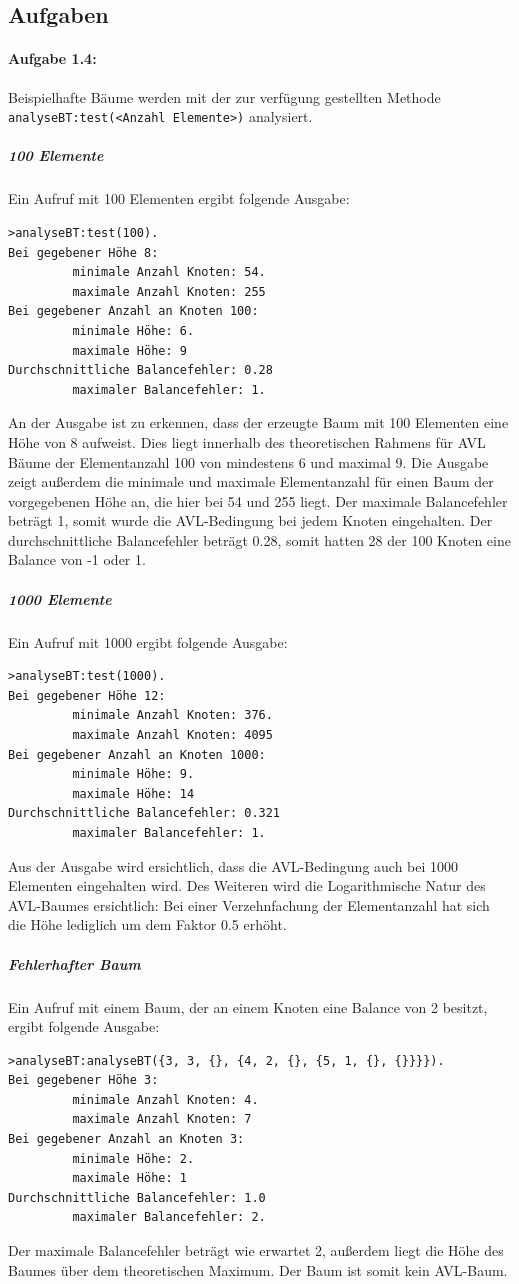 \FloatBarrier
\subsection{Aufgaben}\label{subsec:aufgaben}

\paragraph{Aufgabe 1.4:}
Beispielhafte Bäume werden mit der zur verfügung gestellten Methode\\
\verb|analyseBT:test(<Anzahl Elemente>)| analysiert.
\subparagraph{100 Elemente}
Ein Aufruf mit 100 Elementen ergibt folgende Ausgabe:
\begin{verbatim}
>analyseBT:test(100).
Bei gegebener Höhe 8:
         minimale Anzahl Knoten: 54.
         maximale Anzahl Knoten: 255
Bei gegebener Anzahl an Knoten 100:
         minimale Höhe: 6.
         maximale Höhe: 9
Durchschnittliche Balancefehler: 0.28
         maximaler Balancefehler: 1.
\end{verbatim}

An der Ausgabe ist zu erkennen, dass der erzeugte Baum mit 100 Elementen eine Höhe von 8
aufweist.
Dies liegt innerhalb des theoretischen Rahmens für AVL Bäume der Elementanzahl 100 von mindestens
6 und maximal 9.
Die Ausgabe zeigt außerdem die minimale und maximale Elementanzahl für einen Baum der
vorgegebenen Höhe an, die hier bei 54 und 255 liegt.
Der maximale Balancefehler beträgt 1, somit wurde die AVL-Bedingung bei jedem Knoten eingehalten.
Der durchschnittliche Balancefehler beträgt 0.28, somit hatten 28 der 100 Knoten eine Balance
von -1 oder 1.

\subparagraph{1000 Elemente}
Ein Aufruf mit 1000 ergibt folgende Ausgabe:
\begin{verbatim}
>analyseBT:test(1000).
Bei gegebener Höhe 12:
         minimale Anzahl Knoten: 376.
         maximale Anzahl Knoten: 4095
Bei gegebener Anzahl an Knoten 1000:
         minimale Höhe: 9.
         maximale Höhe: 14
Durchschnittliche Balancefehler: 0.321
         maximaler Balancefehler: 1.
\end{verbatim}

Aus der Ausgabe wird ersichtlich, dass die AVL-Bedingung auch bei 1000 Elementen eingehalten wird.
Des Weiteren wird die Logarithmische Natur des AVL-Baumes ersichtlich:
Bei einer Verzehnfachung der Elementanzahl hat sich die Höhe lediglich um dem Faktor 0.5 erhöht.

\subparagraph{Fehlerhafter Baum}
Ein Aufruf mit einem Baum, der an einem Knoten eine Balance von 2 besitzt, ergibt folgende Ausgabe:
\begin{verbatim}
>analyseBT:analyseBT({3, 3, {}, {4, 2, {}, {5, 1, {}, {}}}}).
Bei gegebener Höhe 3:
         minimale Anzahl Knoten: 4.
         maximale Anzahl Knoten: 7
Bei gegebener Anzahl an Knoten 3:
         minimale Höhe: 2.
         maximale Höhe: 1
Durchschnittliche Balancefehler: 1.0
         maximaler Balancefehler: 2.
\end{verbatim}
Der maximale Balancefehler beträgt wie erwartet 2, außerdem liegt die Höhe des Baumes über dem
theoretischen Maximum.
Der Baum ist somit kein AVL-Baum.

